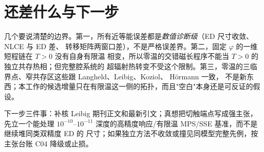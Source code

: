 \documentclass[UTF8,11pt,a4paper]{ctexart}
\begin{document}
\section{还差什么与下一步}

几个要说清楚的边界。第一，所有近等能误差都是\emph{数值诊断级}（ED 尺寸收敛、NLCE 与 ED 差、
转移矩阵两窗口差），不是严格误差界。第二，固定 $\varphi$ 的一维短程链在 $T>0$ 没有自身有限温
相变\cite{Araki1969Gibbs}，所以零温的交错磁长程序不能当 $T>0$ 的独立共存热相；但完整腔系统的
超辐射热转变不受这个限制。第三，零温的三临界点、窄共存区这些跟 Langheld、Leibig、Koziol、
Hörmann 一致\cite{Langheld2025Wormhole,Leibig2026SelfConsistent,Koziol2026Criticality,Hormann2026Folds}，
不是新东西；本工作的候选增量只在有限温这一侧的拓扑，而且"空白"本身还是可反证的假设。

下一步三件事：补核 Leibig 期刊正文和最新引文；真想把切触端点写成强主张，先立一个能处理
$10^{-10}$--$10^{-11}$ 深度的高精度响应/有限温 MPS/SSE 基准，而不是继续堆同类双精度 ED 的
尺寸；如果独立方法不收敛或撞见同模型完整先例，按主张台账 C04 降级或止损。

\printbibliography[title={参考文献}]
\end{document}
